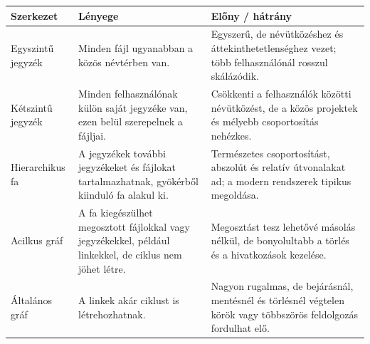 \begin{tabularx}{\textwidth}{L{30mm}X X}
\toprule
\textbf{Szerkezet} & \textbf{Lényege} & \textbf{Előny / hátrány} \\
\midrule
Egyszintű jegyzék & Minden fájl ugyanabban a közös névtérben van. & Egyszerű, de névütközéshez és áttekinthetetlenséghez vezet; több felhasználónál rosszul skálázódik. \\
Kétszintű jegyzék & Minden felhasználónak külön saját jegyzéke van, ezen belül szerepelnek a fájljai. & Csökkenti a felhasználók közötti névütközést, de a közös projektek és mélyebb csoportosítás nehézkes. \\
Hierarchikus fa & A jegyzékek további jegyzékeket és fájlokat tartalmazhatnak, gyökérből kiinduló fa alakul ki. & Természetes csoportosítást, abszolút és relatív útvonalakat ad; a modern rendszerek tipikus megoldása. \\
Acilkus gráf & A fa kiegészülhet megosztott fájlokkal vagy jegyzékekkel, például linkekkel, de ciklus nem jöhet létre. & Megosztást tesz lehetővé másolás nélkül, de bonyolultabb a törlés és a hivatkozások kezelése. \\
Általános gráf & A linkek akár ciklust is létrehozhatnak. & Nagyon rugalmas, de bejárásnál, mentésnél és törlésnél végtelen körök vagy többszörös feldolgozás fordulhat elő. \\
\bottomrule
\end{tabularx}
